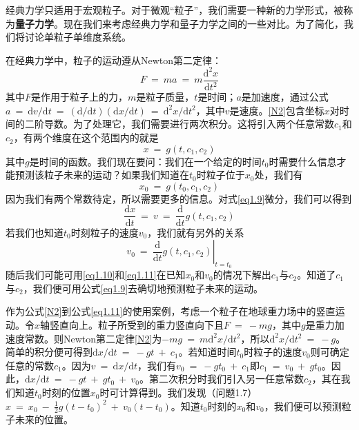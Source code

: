 \documentclass[12pt,a4paper,openany]{ctexbook}
\begin{document}
\begin{flushleft}
    \setlength{\parindent}{2em}
经典力学只适用于宏观粒子。对于微观“粒子”，我们需要一种新的力学形式，被称为\textbf{量子力学}。现在我们来考虑经典力学和量子力学之间的一些对比。为了简化，我们将讨论单粒子单维度系统。

在经典力学中，粒子的运动遵从Newton第二定律：
\begin{equation}
    \boxed{F\ =\ ma\ =\ m\frac{\mathrm{d}^2x}{\mathrm{d}t^2}}
    \label{N2}
\end{equation}
其中$F$是作用于粒子上的力，$m$是粒子质量，$t$是时间；$a$是加速度，通过公式$a\ =\ \mathrm{d}v/\mathrm{d}t\ =\ (\mathrm{d}/\mathrm{d}t)(\mathrm{d}x/\mathrm{d}t)\ =\ \mathrm{d}^2x/\mathrm{d}t^2$，其中$v$是速度。\eqref{N2}包含坐标$x$对时间的二阶导数。为了处理它，我们需要进行两次积分。这将引入两个任意常数$c_1$和$c_2$，有两个维度在这个范围内的就是
\begin{equation}
    x\ =\ g(t,c_1,c_2)
    \label{eq1.9}
\end{equation}
其中$g$是时间的函数。我们现在要问：我们在一个给定的时间$t_0$时需要什么信息才能预测该粒子未来的运动？如果我们知道在$t_0$时粒子位于$x_0$处，我们有
\begin{equation}
    x_0\ =\ g(t_0,c_1,c_2)
    \label{eq1.10}
\end{equation}
因为我们有两个常数待定，所以需要更多的信息。对式\eqref{eq1.9}微分，我们可以得到
\begin{equation*}
    \frac{\mathrm{d}x}{\mathrm{d}t}\ =\ v\ =\ \frac{\mathrm{d}}{\mathrm{d}t}g(t,c_1,c_2)
\end{equation*}
若我们也知道$t_0$时刻粒子的速度$v_0$，我们就有另外的关系
\begin{equation}
    v_0\ =\ \left. \frac{\mathrm{d}}{\mathrm{d}t}g(t,c_1,c_2)\right|_{t=t_0}
    \label{eq1.11}
\end{equation}
随后我们可能可用\eqref{eq1.10}和\eqref{eq1.11}在已知$x_0$和$v_0$的情况下解出$c_1$与$c_2$。知道了$c_1$与$c_2$，我们便可用公式\eqref{eq1.9}去确切地预测粒子未来的运动。

作为公式\eqref{N2}到公式\eqref{eq1.11}的使用案例，考虑一个粒子在地球重力场中的竖直运动。令$x$轴竖直向上。粒子所受到的重力竖直向下且$F\ =\ -mg$，其中$g$是重力加速度常数。则Newton第二定律\eqref{N2}为$-mg\ =\ m\mathrm{d}^2x/\mathrm{d}t^2$，所以$\mathrm{d}^2x/\mathrm{d}t^2\ =\ -g$。简单的积分便可得到$\mathrm{d}x/\mathrm{d}t\ =\ -gt\ +\ c_1$。若知道时间$t_0$时粒子的速度$v_0$则可确定任意的常数$c_1$。因为$v\ =\ \mathrm{d}x/\mathrm{d}t$，我们有$v_0\ =\ -gt_0\ +\ c_1$即$c_1\ =\ v_0\ +\ gt_0$。因此，$\mathrm{d}x/\mathrm{d}t\ =\ -gt\ +\ gt_0\ +\ v_0$。第二次积分时我们引入另一任意常数$c_2$，其在我们知道$t_0$时刻的位置$x_0$时可计算得到。我们发现（问题1.7）$x\ =\ x_0\ -\ \frac{1}{2}g(t-t_0)^2\ +\ v_0(t-t_0)$。知道$t_0$时刻的$x_0$和$v_0$，我们便可以预测粒子未来的位置。


\end{flushleft}
\end{document}
